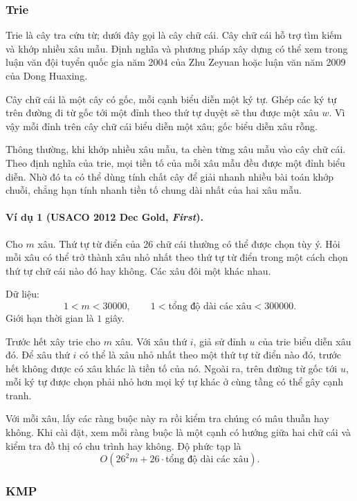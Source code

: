 \documentclass[11pt]{article}
\begin{document}
\subsubsection{Trie}

Trie là cây tra cứu từ; dưới đây gọi là cây chữ cái. Cây chữ cái hỗ trợ tìm kiếm
và khớp nhiều xâu mẫu. Định nghĩa và phương pháp xây dựng có thể xem trong luận
văn đội tuyển quốc gia năm 2004 của Zhu Zeyuan hoặc luận văn năm 2009 của Dong
Huaxing.

Cây chữ cái là một cây có gốc, mỗi cạnh biểu diễn một ký tự. Ghép các ký tự trên
đường đi từ gốc tới một đỉnh theo thứ tự duyệt sẽ thu được một xâu \(w\). Vì
vậy mỗi đỉnh trên cây chữ cái biểu diễn một xâu; gốc biểu diễn xâu rỗng.

Thông thường, khi khớp nhiều xâu mẫu, ta chèn từng xâu mẫu vào cây chữ cái. Theo
định nghĩa của trie, mọi tiền tố của mỗi xâu mẫu đều được một đỉnh biểu diễn.
Nhờ đó ta có thể dùng tính chất cây để giải nhanh nhiều bài toán khớp chuỗi,
chẳng hạn tính nhanh tiền tố chung dài nhất của hai xâu mẫu.

\paragraph{Ví dụ 1 (USACO 2012 Dec Gold, \emph{First}).}
Cho \(m\) xâu. Thứ tự từ điển của 26 chữ cái thường có thể được chọn tùy ý. Hỏi
mỗi xâu có thể trở thành xâu nhỏ nhất theo thứ tự từ điển trong một cách chọn
thứ tự chữ cái nào đó hay không. Các xâu đôi một khác nhau.

Dữ liệu:
\[
  1<m<30000,\qquad 1<\text{tổng độ dài các xâu}<300000.
\]
Giới hạn thời gian là \(1\) giây.

Trước hết xây trie cho \(m\) xâu. Với xâu thứ \(i\), giả sử đỉnh \(u\) của
trie biểu diễn xâu đó. Để xâu thứ \(i\) có thể là xâu nhỏ nhất theo một thứ tự
từ điển nào đó, trước hết không được có xâu khác là tiền tố của nó. Ngoài ra,
trên đường từ gốc tới \(u\), mỗi ký tự được chọn phải nhỏ hơn mọi ký tự khác ở
cùng tầng có thể gây cạnh tranh.

Với mỗi xâu, lấy các ràng buộc này ra rồi kiểm tra chúng có mâu thuẫn hay không.
Khi cài đặt, xem mỗi ràng buộc là một cạnh có hướng giữa hai chữ cái và kiểm tra
đồ thị có chu trình hay không. Độ phức tạp là
\[
  O(26^2m+26\cdot \text{tổng độ dài các xâu}).
\]

\subsubsection{KMP}
\end{document}
